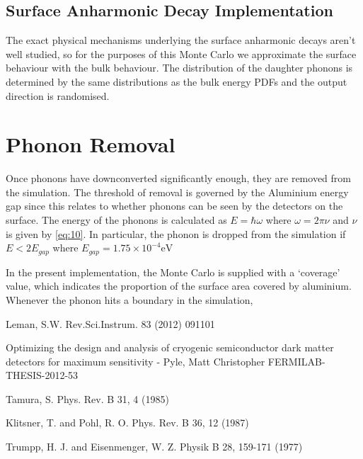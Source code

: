 \documentclass[11pt]{article}
\newcommand{\e}[1]{\times 10^{#1}}
\begin{document}
\subsection*{Surface Anharmonic Decay Implementation}
The exact physical mechanisms underlying the surface anharmonic decays aren't well studied, so for the purposes of this Monte Carlo we approximate
the surface behaviour with the bulk behaviour. The distribution of the daughter phonons is determined by the same distributions as the bulk 
energy PDFs and the output direction is randomised.

\section*{Phonon Removal}
Once phonons have downconverted significantly enough, they are removed from the simulation. The threshold of removal is governed by the Aluminium 
energy gap since this relates to whether phonons can be seen by the detectors on the surface. The energy of the phonons is calculated as 
$E = \hbar \omega$ where $\omega = 2\pi \nu$ and $\nu$ is given by \eqref{eq:10}. In particular, the phonon is dropped from the simulation if 
$E < 2E_{gap}$ where $E_{gap} = 1.75\e{-4} \si{\electronvolt}$

In the present implementation, the Monte Carlo is supplied with a `coverage' value, which indicates the proportion of the surface area covered
by aluminium. Whenever the phonon hits a boundary in the simulation, 

\pagebreak
\begin{thebibliography}{99} 
Leman, S.W. Rev.Sci.Instrum. 83 (2012) 091101 

Optimizing the design and analysis of cryogenic semiconductor dark matter detectors for maximum sensitivity - Pyle, Matt Christopher FERMILAB-THESIS-2012-53

Tamura, S. Phys. Rev. B 31, 4 (1985)

Klitsner, T. and Pohl, R. O. Phys. Rev. B 36, 12 (1987)

Trumpp, H. J. and Eisenmenger, W. Z. Physik B 28, 159-171 (1977)
\end{thebibliography}
\end{document}
